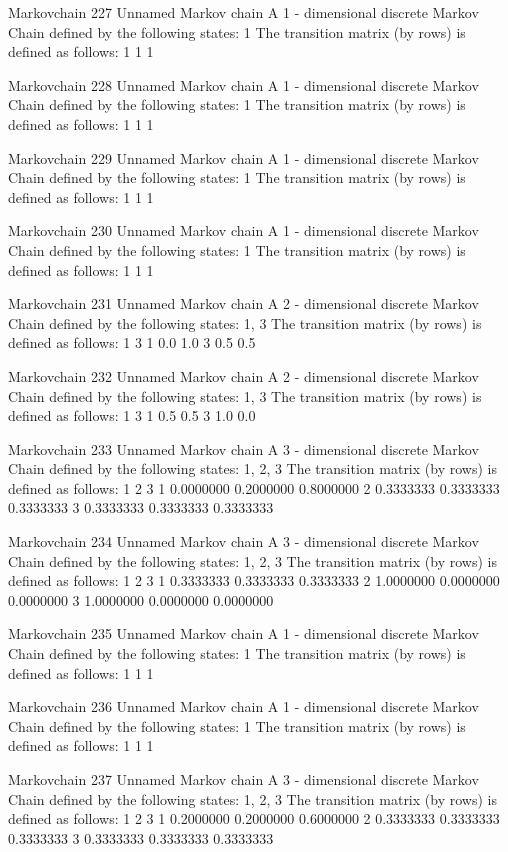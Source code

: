 \documentclass[
  nojss]{jss}
\begin{document}
\begin{CodeChunk}
\begin{CodeOutput}
Markovchain  227 
Unnamed Markov chain 
 A  1 - dimensional discrete Markov Chain defined by the following states: 
 1 
 The transition matrix  (by rows)  is defined as follows: 
  1
1 1

Markovchain  228 
Unnamed Markov chain 
 A  1 - dimensional discrete Markov Chain defined by the following states: 
 1 
 The transition matrix  (by rows)  is defined as follows: 
  1
1 1

Markovchain  229 
Unnamed Markov chain 
 A  1 - dimensional discrete Markov Chain defined by the following states: 
 1 
 The transition matrix  (by rows)  is defined as follows: 
  1
1 1

Markovchain  230 
Unnamed Markov chain 
 A  1 - dimensional discrete Markov Chain defined by the following states: 
 1 
 The transition matrix  (by rows)  is defined as follows: 
  1
1 1

Markovchain  231 
Unnamed Markov chain 
 A  2 - dimensional discrete Markov Chain defined by the following states: 
 1, 3 
 The transition matrix  (by rows)  is defined as follows: 
    1   3
1 0.0 1.0
3 0.5 0.5

Markovchain  232 
Unnamed Markov chain 
 A  2 - dimensional discrete Markov Chain defined by the following states: 
 1, 3 
 The transition matrix  (by rows)  is defined as follows: 
    1   3
1 0.5 0.5
3 1.0 0.0

Markovchain  233 
Unnamed Markov chain 
 A  3 - dimensional discrete Markov Chain defined by the following states: 
 1, 2, 3 
 The transition matrix  (by rows)  is defined as follows: 
          1         2         3
1 0.0000000 0.2000000 0.8000000
2 0.3333333 0.3333333 0.3333333
3 0.3333333 0.3333333 0.3333333

Markovchain  234 
Unnamed Markov chain 
 A  3 - dimensional discrete Markov Chain defined by the following states: 
 1, 2, 3 
 The transition matrix  (by rows)  is defined as follows: 
          1         2         3
1 0.3333333 0.3333333 0.3333333
2 1.0000000 0.0000000 0.0000000
3 1.0000000 0.0000000 0.0000000

Markovchain  235 
Unnamed Markov chain 
 A  1 - dimensional discrete Markov Chain defined by the following states: 
 1 
 The transition matrix  (by rows)  is defined as follows: 
  1
1 1

Markovchain  236 
Unnamed Markov chain 
 A  1 - dimensional discrete Markov Chain defined by the following states: 
 1 
 The transition matrix  (by rows)  is defined as follows: 
  1
1 1

Markovchain  237 
Unnamed Markov chain 
 A  3 - dimensional discrete Markov Chain defined by the following states: 
 1, 2, 3 
 The transition matrix  (by rows)  is defined as follows: 
          1         2         3
1 0.2000000 0.2000000 0.6000000
2 0.3333333 0.3333333 0.3333333
3 0.3333333 0.3333333 0.3333333


\end{CodeOutput}
\end{CodeChunk}
\end{document}
